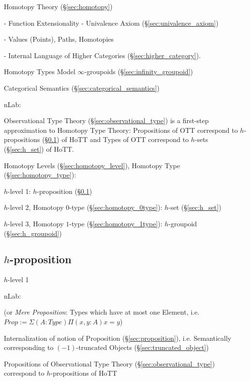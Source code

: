 Homotopy Theory (\S\ref{sec:homotopy})

- Function Extensionality
- Univalence Axiom (\S\ref{sec:univalence_axiom})

- Values (Points), Paths, Homotopies

- Internal Language of Higher Categories
(\S\ref{sec:higher_category}).

Homotopy Types Model $\infty$-groupoids
(\S\ref{sec:infinity_groupoid})

Categorical Semantics (\S\ref{sec:categorical_semantics})

nLab:

Observational Type Theory (\S\ref{sec:observational_type}) is a
first-step approximation to Homotopy Type Theory: Propositions of OTT
correspond to $h$-propositions (\S\ref{sec:h_proposition}) of HoTT and
Types of OTT correspond to $h$-sets (\S\ref{sec:h_set}) of HoTT.

Homotopy Levels (\S\ref{sec:homotopy_level}), Homotopy Type
(\S\ref{sec:homotopy_type}):

$h$-level 1: $h$-proposition (\S\ref{sec:h_proposition})

$h$-level 2, Homotopy $0$-type (\S\ref{sec:homotopy_0type}): $h$-set
(\S\ref{sec:h_set})

$h$-level 3, Homotopy $1$-type (\S\ref{sec:homotopy_1type}):
$h$-groupoid (\S\ref{sec:h_groupoid})



\subsection{$h$-proposition}\label{sec:h_proposition}

$h$-level 1

nLab:

(or \emph{Mere Proposition}: Types which have at most one Element,
i.e. $Prop := \Sigma(A : Type) \Pi(x, y : A) x = y$)

Internalization of notion of Proposition (\S\ref{sec:proposition}),
i.e. Semantically corresponding to $(-1)$-truncated Objects
(\S\ref{sec:truncated_object})

Propositions of Observational Type Theory
(\S\ref{sec:observational_type}) correspond to $h$-propositions of HoTT



